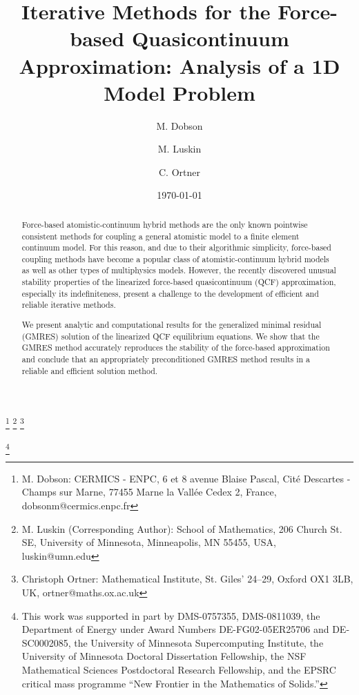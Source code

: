 \documentclass[12pt,reqno]{amsart}
\begin{document}
\title[Iterative Methods for the Force-based QC
Approximation]{Iterative Methods for the Force-based Quasicontinuum Approximation: Analysis of a 1D Model Problem}

\author{M. Dobson}

\author{M. Luskin}

\author{C. Ortner}

\date{\today}

\thanks{M. Dobson: CERMICS - ENPC,
6 et 8 avenue Blaise Pascal,
Cit\'e Descartes - Champs sur Marne,
77455 Marne la Vall\'ee Cedex 2, France, dobsonm@cermics.enpc.fr}
\thanks{M. Luskin (Corresponding Author):
School of Mathematics, 206 Church St. SE,
  University of Minnesota, Minneapolis, MN 55455, USA,
luskin@umn.edu}
\thanks{Christoph Ortner:
Mathematical Institute, St. Giles' 24--29, Oxford OX1 3LB, UK, ortner@maths.ox.ac.uk}

\thanks{ This work was supported in part by DMS-0757355, DMS-0811039,
  the Department of Energy under Award Numbers DE-FG02-05ER25706
and DE-SC0002085, the University of
  Minnesota Supercomputing Institute, the University of Minnesota
  Doctoral Dissertation Fellowship, the NSF Mathematical Sciences
  Postdoctoral Research Fellowship, and the EPSRC critical mass
  programme ``New Frontier in the Mathematics of Solids.''  }


\begin{abstract}
  Force-based atomistic-continuum hybrid methods are the only known
  pointwise consistent methods for coupling a general atomistic model
  to a finite element continuum model. For this reason, and due to
  their algorithmic simplicity, force-based coupling methods have
  become a popular class of atomistic-continuum hybrid models as well
  as other types of multiphysics models. However, the recently
  discovered unusual stability properties of the linearized
  force-based quasicontinuum (QCF) approximation, especially its
  indefiniteness, present a challenge to the development of efficient
  and reliable iterative methods.

  We present analytic and computational results for the generalized
  minimal residual (GMRES) solution of the linearized QCF equilibrium
  equations.  We show that the GMRES method accurately reproduces the
  stability of the force-based approximation and conclude that an
  appropriately preconditioned GMRES method results in a reliable and
  efficient solution method.
  \end{abstract}
\end{document}
